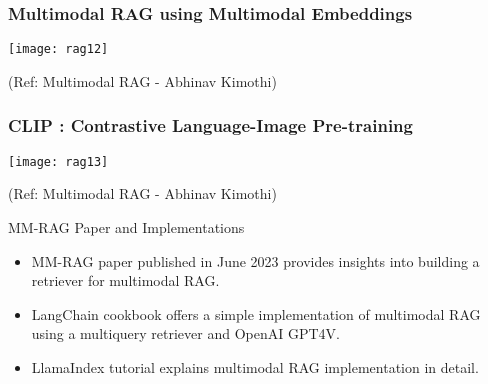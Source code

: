 \begin{frame}[fragile]\frametitle{Multimodal RAG using Multimodal Embeddings}


		\begin{center}
		\texttt{[image: rag12]}
		\end{center}

{\tiny (Ref: Multimodal RAG - Abhinav  Kimothi)}

\end{frame}

\begin{frame}[fragile]\frametitle{CLIP : Contrastive Language-Image Pre-training}


		\begin{center}
		\texttt{[image: rag13]}
		\end{center}

{\tiny (Ref: Multimodal RAG - Abhinav  Kimothi)}

\end{frame}


\begin{frame}[fragile]{MM-RAG Paper and Implementations}
    \begin{itemize}
        \item MM-RAG paper published in June 2023 provides insights into building a retriever for multimodal RAG.
        \item LangChain cookbook offers a simple implementation of multimodal RAG using a multiquery retriever and OpenAI GPT4V.
        \item LlamaIndex tutorial explains multimodal RAG implementation in detail.
    \end{itemize}
\end{frame}

